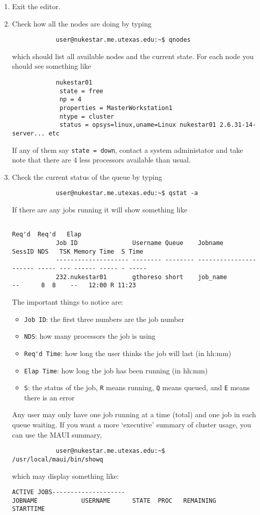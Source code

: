 \documentclass[a4paper, 12pt]{article}
\begin{document}
\begin{enumerate}
	\item Exit the editor.
	\item Check how all the nodes are doing by typing
		\begin{verbatim}
			user@nukestar.me.utexas.edu:~$ qnodes
		\end{verbatim}
		which should list all available nodes and the current state. For each node you should see something like
		\begin{verbatim}
			nukestar01
		     state = free
		     np = 4
		     properties = MasterWorkstation1
		     ntype = cluster
		     status = opsys=linux,uname=Linux nukestar01 2.6.31-14-server... etc
		\end{verbatim}
		If any of them say \verb+state = down+, contact a system administator and take note that there are 4 less processors available than usual.
	\item Check the current status of the queue by typing
		\begin{verbatim}
			user@nukestar.me.utexas.edu:~$ qstat -a
		\end{verbatim}
		If there are any jobs running it will show something like
		{\footnotesize
		\begin{verbatim}
			                                                                         Req'd  Req'd   Elap
			Job ID               Username Queue    Jobname          SessID NDS   TSK Memory Time  S Time
			-------------------- -------- -------- ---------------- ------ ----- --- ------ ----- - -----
			232.nukestar01       gthoreso short    job_name            --      8  8    --   12:00 R 11:23
		\end{verbatim}
		}
		The important things to notice are:
		\begin{itemize}
			\item \verb+Job ID+: the first three numbers are the job number
			\item \verb+NDS+: how many processors the job is using
			\item \verb+Req'd Time+: how long the user thinks the job will last (in hh:mm)
			\item \verb+Elap Time+: how long the job has been running (in hh:mm)
			\item \verb+S+: the status of the job, \verb+R+ means running, \verb+Q+ means queued, and \verb+E+ means there is an error
		\end{itemize}
		Any user may only have one job running at a time (total) and one job in each queue waiting. If you want a more `executive' summary of cluster usage, you can use the MAUI summary,
		\begin{verbatim}
			user@nukestar.me.utexas.edu:~$ /usr/local/maui/bin/showq
		\end{verbatim}
		which may display something like:
		{\footnotesize
		\begin{verbatim}
ACTIVE JOBS--------------------
JOBNAME            USERNAME      STATE  PROC   REMAINING            STARTTIME


\end{verbatim}}
\end{enumerate}
\end{document}
